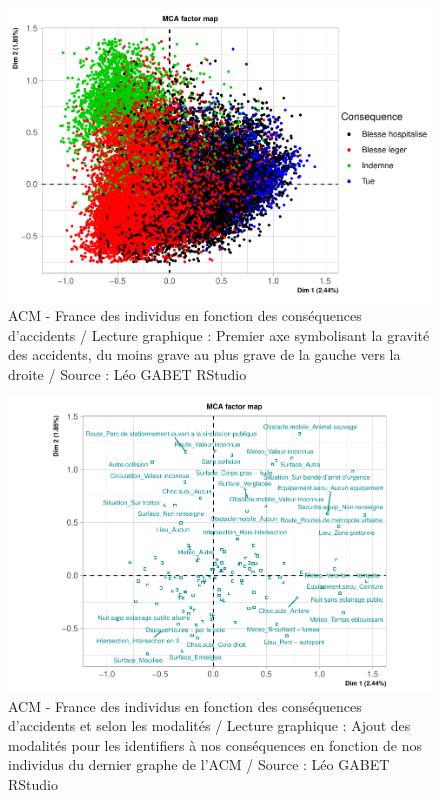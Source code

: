 \documentclass[french,]{compterendu}
\theoremstyle{urcastyle}
\theoremstyle{remark}
\begin{document}
\begin{figure}[H]

{\centering \includegraphics[width=0.9\linewidth]{Rapport_ADD_LEO-GABET_files/figure-latex/acm1-1} 

}

\caption{ACM - France des individus en fonction des conséquences d'accidents / Lecture graphique : Premier axe symbolisant la gravité des accidents, du moins grave au plus grave de la gauche vers la droite / Source : Léo GABET RStudio}\label{fig:acm1}
\end{figure}

\begin{figure}[H]

{\centering \includegraphics[width=0.9\linewidth]{Rapport_ADD_LEO-GABET_files/figure-latex/acm10-1} 

}

\caption{ACM - France des individus en fonction des conséquences d'accidents et selon les modalités / Lecture graphique : Ajout des modalités pour les identifiers à nos conséquences en fonction de nos individus du dernier graphe de l'ACM / Source : Léo GABET RStudio}\label{fig:acm10}
\end{figure}
\end{document}

